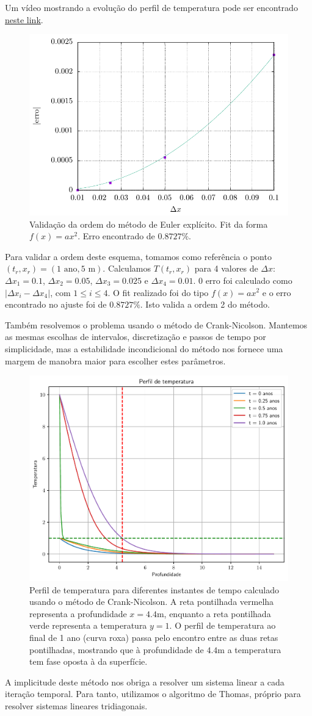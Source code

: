\documentclass[twocolumn,showpacs,%
  nofootinbib,aps,superscriptaddress,%
  eqsecnum,prd,notitlepage,showkeys,10pt]{revtex4-1} %
\renewcommand{\leq}{\leqslant}
\begin{document}
	Um vídeo mostrando a evolução do perfil de temperatura pode ser encontrado
	\href{https://github.com/CaioTomas/Trabalho-IMCEDP/blob/main/Report/Codes/exp-euler.mp4}{neste link}.
	\begin{figure}[t]%
		\label{fig:ordem-exp-euler}
		\includegraphics[width=.45\textwidth]{Codes/ordem-exp-euler.pdf}
		\caption{Validação da ordem do método de Euler explícito. Fit da forma $f(x) = ax^2$.
		Erro encontrado de $0.8727\%$.}
	\end{figure}
	Para validar a ordem deste esquema, tomamos como referência o ponto
	$(t_r, x_r) = (1 \text{ ano}, 5 \text{ m})$. Calculamos $T(t_r, x_r)$
	para 4 valores de $\Delta x$: $\Delta x_1 = 0.1$, $\Delta x_2 = 0.05$, $\Delta x_3 = 0.025$
	e $\Delta x_4 = 0.01$. 0 erro foi calculado como $|\Delta x_i - \Delta x_4|$, com $1 \leq i \leq 4$.
	O fit realizado foi do tipo $f(x) = ax^2$ e o erro encontrado no ajuste foi de $0.8727\%$.
	Isto valida a ordem 2 do método.
	
	Também resolvemos o problema usando o método de Crank-Nicolson. Mantemos as mesmas
	escolhas de intervalos, discretização e passos de tempo por simplicidade, mas a estabilidade
	incondicional do método nos fornece uma margem de manobra maior para escolher estes parâmetros.
	\begin{figure}[b]%
		\label{fig:crank-nicolson}
		\includegraphics[width=.45\textwidth]{Codes/crank-nicolson.pdf}
		\caption{Perfil de temperatura para diferentes instantes de tempo calculado usando
		o método de Crank-Nicolson. A reta pontilhada
		vermelha representa a profundidade $x = 4.4$m, enquanto a reta pontilhada verde
		representa a temperatura $y=1$. O perfil de temperatura ao final de 1 ano (curva roxa)
		passa pelo encontro entre as duas retas pontilhadas, mostrando que à profundidade
		de $4.4$m a temperatura tem fase oposta à da superfície.}
	\end{figure}
	A implicitude deste método nos obriga a resolver um sistema linear a cada iteração temporal.
	Para tanto, utilizamos o algoritmo de Thomas, próprio para resolver sistemas lineares tridiagonais.
	
\end{document}
